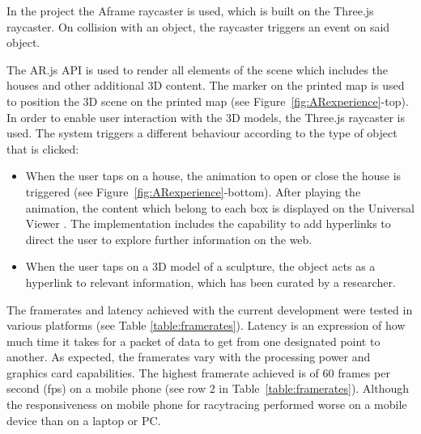 \documentclass{egpubl}
\begin{document}
In the project the Aframe raycaster is used, which is built
on the Three.js raycaster. On collision with an object, the raycaster triggers
an event on said object. 

The AR.js API is used to render all elements of the scene which includes the
houses and other additional 3D content. The marker on the printed map is used
to position the 3D scene on the printed map (see
Figure~\ref{fig:ARexperience}-top). In order to enable user interaction with
the 3D models, the Three.js raycaster is used. The system triggers a different
behaviour according to the type of object that is clicked: 

\begin{itemize}
\item When the user taps on a house, the animation to open or close the house
is triggered (see Figure~\ref{fig:ARexperience}-bottom). After playing the
animation, the content which belong to each box is displayed on the Universal
Viewer \cite{uv}. The implementation includes the capability to add hyperlinks
to direct the user to explore further information on the web. 
\item When the
user taps on a 3D model of a sculpture, the object acts as a hyperlink to
relevant information, which has been curated by a researcher.  
\end{itemize}


The framerates and latency achieved with the current development were tested
in various platforms (see Table \ref{table:framerates}). Latency is an
expression of how much time it takes for a packet of data to get from one
designated point to another. As expected, the framerates vary with the
processing power and graphics card capabilities. The highest framerate
achieved is of 60 frames per second (fps) on a mobile phone (see row 2 in
Table~\ref{table:framerates}). Although the responsiveness on mobile phone for
racytracing performed worse on a mobile device than on a laptop or PC.
\end{document}
